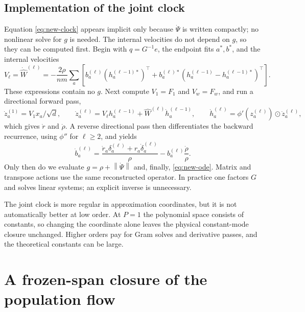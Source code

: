 \documentclass[11pt]{article}
\theoremstyle{definition}
\theoremstyle{remark}
\newcommand{\norm}[1]{\left\lVert #1\right\rVert}
\newcommand{\od}{\mathbin{\odot}}
\begin{document}
\subsection*{Implementation of the joint clock}
\label{app:joint-impl}

Equation \eqref{eq:new-clock} appears implicit only because $\dot\Psi$ is
written compactly; no nonlinear solve for $g$ is needed.  The internal
velocities do not depend on $g$, so they can be computed first.  Begin with
$q=G^{-1}e$, the endpoint fits $a^*,b^*$, and the internal velocities
\begin{equation}
 V_\ell=\dot{\widehat W}^{(\ell)}=-\frac{2\rho}{nm}\sum_a
 \left[b^{(\ell)}_a(h^{(\ell-1)*}_a)^\top+
 b^{(\ell)*}_a(h^{(\ell-1)}_a-h^{(\ell-1)*}_a)^\top\right]. \label{eq:internal-velocity}
\end{equation}
These expressions contain no $g$.  Next compute $V_1=F_1$ and $V_w=F_w$, and run
a directional forward pass,
\[
 \dot z_a^{(1)}=V_1x_a/\sqrt d,\qquad
 \dot z_a^{(\ell)}=V_\ell h_a^{(\ell-1)}+
 \widehat W^{(\ell)}\dot h_a^{(\ell-1)},\qquad
 \dot h_a^{(\ell)}=\phi'(z_a^{(\ell)})\od\dot z_a^{(\ell)},
\]
which gives $\dot r$ and $\dot\rho$.  A reverse directional pass then
differentiates the backward recurrence, using $\phi''$ for $\ell\ge2$, and
yields
\[
 \dot b^{(\ell)}_a=\frac{\dot r_a\delta_a^{(\ell)}+
 r_a\dot\delta_a^{(\ell)}}{\rho}-b^{(\ell)}_a\frac{\dot\rho}{\rho}.
\]
Only then do we evaluate $g=\rho+\norm{\dot\Psi}$ and, finally,
\eqref{eq:new-ode}.  Matrix and transpose actions use the same reconstructed
operator.  In practice one factors $G$ and solves linear systems; an explicit
inverse is unnecessary.

The joint clock is more regular in approximation coordinates, but it is not
automatically better at low order.  At $P=1$ the polynomial space consists of
constants, so changing the coordinate alone leaves the physical constant-mode
closure unchanged.  Higher orders pay for Gram solves and derivative passes,
and the theoretical constants can be large.


\section{A frozen-span closure of the population flow}
\label{app:popclosure}
\end{document}
